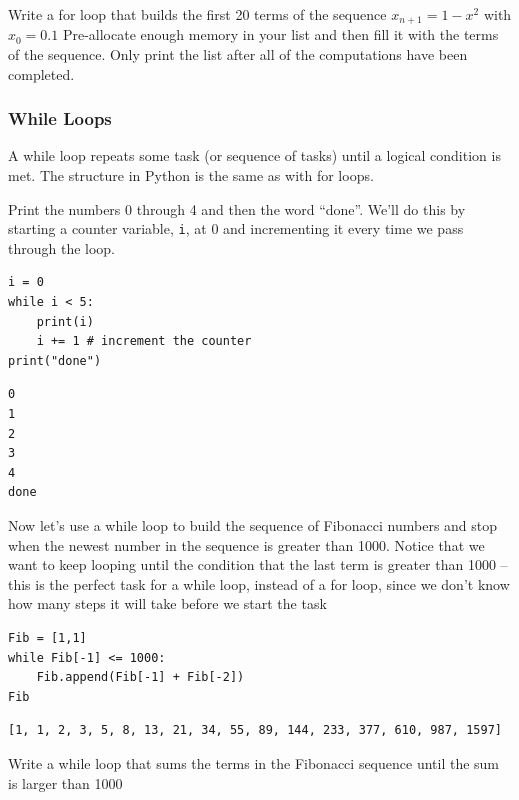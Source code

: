 \begin{problem}
    Write a for loop that builds the first 20 terms of the sequence  $x_{n+1}=1−x^2$ with
    $x_0=0.1$ Pre-allocate enough memory in your list and then fill it with the terms of
    the sequence. Only print the list after all of the computations have been completed.
\end{problem}

\subsubsection{While Loops}
A while loop repeats some task (or sequence of tasks) until a logical condition is met.
The structure in Python is the same as with for loops.

\begin{example}
    Print the numbers 0 through 4 and then the word ``done''. We'll do this by starting a
    counter variable, \texttt{i}, at 0 and incrementing it every time we pass through the
    loop.

    \bcode
\begin{lstlisting}
i = 0
while i < 5:
    print(i)
    i += 1 # increment the counter
print("done")
\end{lstlisting}
\boutput
\begin{lstlisting}
0
1
2
3
4
done
\end{lstlisting}
\end{example}

\begin{example}
    Now let's use a while loop to build the sequence of Fibonacci numbers and stop when
    the newest number in the sequence is greater than 1000. Notice that we want to keep
    looping until the condition that the last term is greater than 1000 -- this is the
    perfect task for a while loop, instead of a for loop, since we don't know how many steps
    it will take before we start the task

    \bcode
\begin{lstlisting}
Fib = [1,1]
while Fib[-1] <= 1000:
    Fib.append(Fib[-1] + Fib[-2])
Fib
\end{lstlisting}
\boutput
\begin{lstlisting}
[1, 1, 2, 3, 5, 8, 13, 21, 34, 55, 89, 144, 233, 377, 610, 987, 1597]
\end{lstlisting}

\end{example}

\begin{problem}
    Write a while loop that sums the terms in the Fibonacci sequence until the sum is
    larger than 1000
\end{problem}


